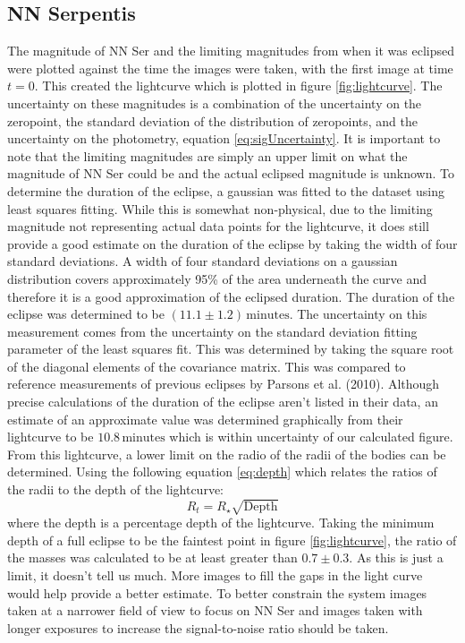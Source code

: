\documentclass[%
reprint,
amsmath,amssymb,
aps,
]{revtex4-2}
\begin{document}
		\subsection{NN Serpentis}
			The magnitude of NN Ser and the limiting magnitudes from when it was eclipsed were plotted against the time the images were taken, with the first image at time $t=0$. This created the lightcurve which is plotted in figure \ref{fig:lightcurve}. The uncertainty on these magnitudes is a combination of the uncertainty on the zeropoint, the standard deviation of the distribution of zeropoints, and the uncertainty on the photometry, equation \ref{eq:sigUncertainty}. It is important to note that the limiting magnitudes are simply an upper limit on what the magnitude of NN Ser could be and the actual eclipsed magnitude is unknown. To determine the duration of the eclipse, a gaussian was fitted to the dataset using least squares fitting. While this is somewhat non-physical, due to the limiting magnitude not representing actual data points for the lightcurve, it does still provide a good estimate on the duration of the eclipse by taking the width of four standard deviations. A width of four standard deviations on a gaussian distribution covers approximately 95\% of the area underneath the curve and therefore it is a good approximation of the eclipsed duration. The duration of the eclipse was determined to be $(11.1 \pm 1.2)\,\text{minutes}$. The uncertainty on this measurement comes from the uncertainty on the standard deviation fitting parameter of the least squares fit. This was determined by taking the square root of the diagonal elements of the covariance matrix. This was compared to reference measurements of previous eclipses by Parsons et al. (2010)\cite{times}. Although precise calculations of the duration of the eclipse aren't listed in their data, an estimate of an approximate value was determined graphically from their lightcurve to be $10.8 \,\text{minutes}$ which is within uncertainty of our calculated figure. From this lightcurve, a lower limit on the radio of the radii of the bodies can be determined. Using the following equation \ref{eq:depth} which relates the ratios of the radii to the depth of the lightcurve\cite{transit}:
			\begin{equation}
				R_t = R_\star \sqrt{\text{Depth}}
				\label{eq:depth}
			\end{equation}where the depth is a percentage depth of the lightcurve. Taking the minimum depth of a full eclipse to be the faintest point in figure \ref{fig:lightcurve}, the ratio of the masses was calculated to be at least greater than $0.7 \pm 0.3$. As this is just a limit, it doesn't tell us much. More images to fill the gaps in the light curve would help provide a better estimate. To better constrain the system images taken at a narrower field of view to focus on NN Ser and images taken with longer exposures to increase the signal-to-noise ratio should be taken.
			
\end{document}
